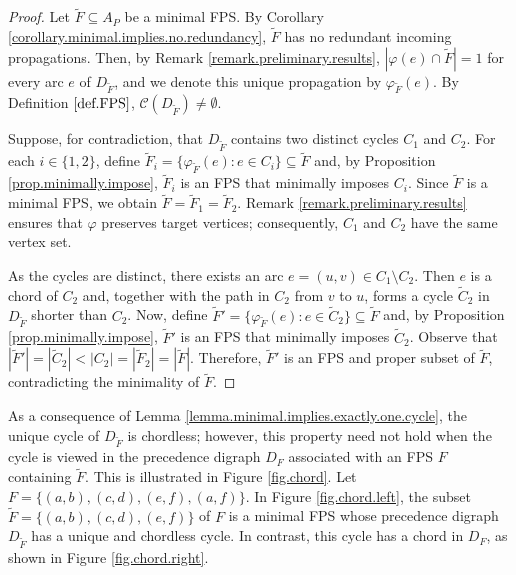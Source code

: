 \documentclass{article}
\newcommand{\CC}{{\mathscr C}}
\begin{document}
\begin{proof}
Let $\tilde F \subseteq A_P$ be a minimal FPS.
By Corollary \ref{corollary.minimal.implies.no.redundancy}, $\tilde F$ has no redundant incoming propagations.
Then, by Remark \ref{remark.preliminary.results}, $|\varphi(e) \cap \tilde F| = 1$ for every arc $e$ of $D_{\tilde F}$, and we denote this unique propagation by $\varphi_{\tilde F}(e)$.
By Definition $\ref{def.FPS}$, $\CC(D_{\tilde F}) \neq \emptyset$.

Suppose, for contradiction, that $D_{\tilde F}$ contains two distinct cycles $C_1$ and $C_2$.
For each $i \in \{1,2\}$, define $\tilde F_i = \{\varphi_{\tilde F}(e) : e \in C_i\} \subseteq \tilde F$ and, by Proposition \ref{prop.minimally.impose}, $\tilde F_i$ is an FPS that minimally imposes $C_i$.
Since $\tilde F$ is a minimal FPS, we obtain $\tilde F = \tilde F_1 = \tilde F_2$.
Remark \ref{remark.preliminary.results} ensures that $\varphi$ preserves target vertices; consequently, $C_1$ and $C_2$ have the same vertex set.

As the cycles are distinct, there exists an arc $e = (u,v) \in C_1 \setminus C_2$.
Then $e$ is a chord of $C_2$ and, together with the path in $C_2$ from $v$ to $u$, forms a cycle $\tilde C_2$ in $D_{\tilde F}$ shorter than $C_2$.
Now, define $\tilde F' = \{\varphi_{\tilde F}(e): e \in \tilde C_2\} \subseteq \tilde F$ and, by Proposition \ref{prop.minimally.impose}, $\tilde F'$ is an FPS that minimally imposes $\tilde C_2$.
Observe that $|\tilde F'| = |\tilde C_2| < |C_2| = |\tilde F_2| = |\tilde F|$.
Therefore, $\tilde F'$ is an FPS and proper subset of $\tilde F$, contradicting the minimality of $\tilde F$.
\end{proof}


As a consequence of Lemma \ref{lemma.minimal.implies.exactly.one.cycle}, the unique cycle of $D_{\tilde F}$ is chordless; however, this property need not hold when the cycle is viewed in the precedence digraph $D_F$ associated with an FPS $F$ containing $\tilde F$.
This is illustrated in Figure \ref{fig.chord}.
Let $F = \{(a,b), (c,d), (e,f), (a,f)\}$.
In Figure \ref{fig.chord.left}, the subset $\tilde F = \{(a,b), (c,d), (e,f)\}$ of $F$ is a minimal FPS whose precedence digraph $D_{\tilde F}$ has a unique and chordless cycle.
In contrast, this cycle has a chord in $D_F$, as shown in Figure \ref{fig.chord.right}.
\end{document}
